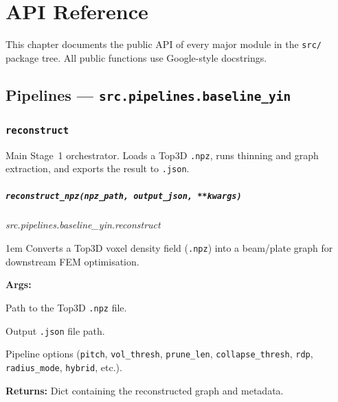 \documentclass[a4paper, 11pt, openany]{report}
\newcommand{\apifunc}[2]{%
    \paragraph{\texttt{#2}}\hfill\textit{\small #1}\par\nopagebreak
}
\begin{document}
\chapter{API Reference}
\label{ch:api}

\sloppy %

This chapter documents the public API of every major module in the
\texttt{src/} package tree.  All public functions use Google-style docstrings.

\section{Pipelines --- \texttt{src.pipelines.baseline\_yin}}
\label{sec:api-pipelines}

\subsection{\texttt{reconstruct}}

Main Stage~1 orchestrator.  Loads a Top3D \texttt{.npz}, runs thinning and
graph extraction, and exports the result to \texttt{.json}.

\apifunc{src.pipelines.baseline\_yin.reconstruct}{reconstruct\_npz(npz\_path, output\_json, **kwargs)}

\begin{adjustwidth}{1em}{}
Converts a Top3D voxel density field (\texttt{.npz}) into a beam/plate graph
for downstream FEM optimisation.

\textbf{Args:}
\begin{description}[nosep, labelwidth=3cm, leftmargin=3.5cm]
    \item[\texttt{npz\_path}] Path to the Top3D \texttt{.npz} file.
    \item[\texttt{output\_json}] Output \texttt{.json} file path.
    \item[\texttt{**kwargs}] Pipeline options (\texttt{pitch}, \texttt{vol\_thresh},
          \texttt{prune\_len}, \texttt{collapse\_thresh}, \texttt{rdp},
          \texttt{radius\_mode}, \texttt{hybrid}, etc.).
\end{description}

\textbf{Returns:} Dict containing the reconstructed graph and metadata.
\end{adjustwidth}
\end{document}
